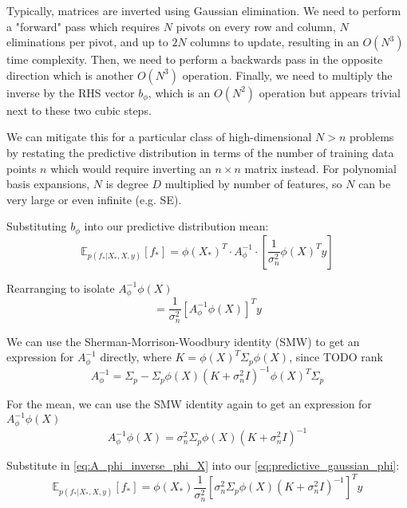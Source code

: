 Typically, matrices are inverted using Gaussian elimination. We need to perform a "forward" pass which requires $N$ pivots on every row and column, $N$ eliminations per pivot, and up to $2N$ columns to update, resulting in an $O(N^3)$ time complexity. Then, we need to perform a backwards pass in the opposite direction which is another $O(N^3)$ operation. Finally, we need to multiply the inverse by the RHS vector $b_{\phi}$, which is an $O(N^2)$ operation but appears trivial next to these two cubic steps. 

We can mitigate this for a particular class of high-dimensional $N > n$ problems by restating the predictive distribution in terms of the number of training data points $n$ which would require inverting an $n \times n$ matrix instead. For polynomial basis expansions, $N$ is degree $D$ multiplied by number of features, so $N$ can be very large or even infinite (e.g. SE). %

Substituting $b_{\phi}$ into our predictive distribution mean:
\begin{equation*}
    \mathbb{E}_{p(f_*|X_*,X,y)}[f_*] = \phi(X_*)^T \cdot A_\phi^{-1} \cdot \left[\frac{1}{\sigma_n^2}\phi(X)^Ty\right]
\end{equation*}

Rearranging to isolate $A_\phi^{-1}\phi(X)$
\begin{equation*}
    = \frac{1}{\sigma_n^2}\left[A_{\phi}^{-1}\phi(X)\right]^Ty
\end{equation*}

We can use the Sherman-Morrison-Woodbury identity (SMW) to get an expression for $A_{\phi}^{-1}$ directly, where $K =\phi(X)^T\Sigma_p\phi(X)$, since TODO rank
\begin{equation*}
    A_{\phi}^{-1} = \Sigma_p - \Sigma_p\phi(X)(K+\sigma_n^2I)^{-1}\phi(X)^T\Sigma_p
\end{equation*}

For the mean, we can use the SMW identity again to get an expression for $A_{\phi}^{-1}\phi(X)$
\begin{equation} \label{eq:A_phi_inverse_phi_X}
    A_{\phi}^{-1}\phi(X) = \sigma_n^2\Sigma_p\phi(X)(K+\sigma_n^2I)^{-1}
\end{equation}

Substitute in \ref{eq:A_phi_inverse_phi_X} into our \ref{eq:predictive_gaussian_phi}:
\begin{equation*}
    \mathbb{E}_{p(f_*|X_*,X,y)}[f_*] = \phi(X_*) \frac{1}{\sigma_n^2}\left[\sigma_n^2\Sigma_p\phi(X)(K+\sigma_n^2I)^{-1}\right]^Ty
\end{equation*}


